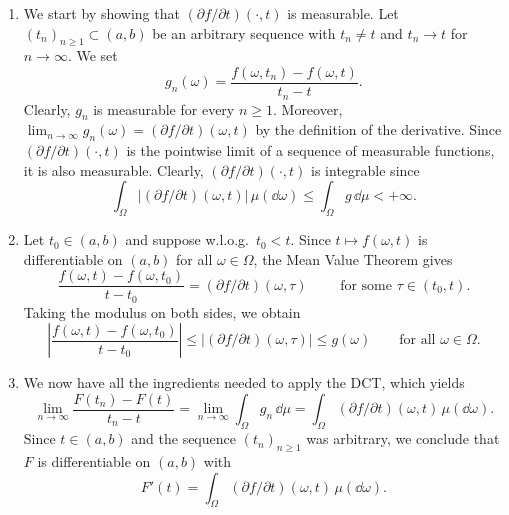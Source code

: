 \begin{enumerate}[label={(\arabic*)}]
	\item We start by showing that $(\partial f/\partial t)(\cdot,t)$ is measurable. Let $(t_n)_{n\ge 1}\subset(a,b)$ be an arbitrary sequence with $t_n\ne t$ and $t_n\to t$ for $n\to\infty$. We set
	\[
		g_n(\omega) = \frac{f(\omega,t_n)-f(\omega,t)}{t_n-t}.
	\]
	Clearly, $g_n$ is measurable for every $n\ge 1$. Moreover, $\lim_{n\to\infty} g_n(\omega) = (\partial f/\partial t)(\omega,t)$ by the definition of the derivative. Since $(\partial f/\partial t)(\cdot,t)$ is the pointwise limit of a sequence of measurable functions, it is also measurable. Clearly, $(\partial f/\partial t)(\cdot,t)$ is integrable since
	\[
		\int_\Omega |(\partial f/\partial t)(\omega,t)|\,\mu(\dd\omega) \le \int_\Omega g\,\dd\mu <+\infty.
	\]
	
	\item Let $t_0\in (a,b)$ and suppose w.l.o.g.\ $t_0<t$. Since $t\mapsto f(\omega,t)$ is differentiable on $(a,b)$ for all $\omega\in\Omega$, the Mean Value Theorem gives
	\[
		\frac{f(\omega,t)-f(\omega,t_0)}{t-t_0} = (\partial f/\partial t)(\omega,\tau)\qquad\text{	for some $\tau\in(t_0,t)$.}
	\]
	Taking the modulus on both sides, we obtain
	\[
		\left|\frac{f(\omega,t)-f(\omega,t_0)}{t-t_0}\right| \le |(\partial f/\partial t)(\omega,\tau)|\le g(\omega)\qquad\text{for all $\omega\in\Omega$}.
	\]
	\item We now have all the ingredients needed to apply the DCT, which yields
	\[
		\lim_{n\to\infty} \frac{F(t_n)-F(t)}{t_n-t} = \lim_{n\to\infty} \int_\Omega g_n\,\dd\mu = \int_\Omega (\partial f/\partial t)(\omega,t)\,\mu(\dd\omega).
	\]
	Since $t\in(a,b)$ and the sequence $(t_n)_{n\ge 1}$ was arbitrary, we conclude that $F$ is differentiable on $(a,b)$ with 
	\[
		F'(t) = \int_\Omega (\partial f/\partial t)(\omega,t)\,\mu(\dd\omega).
	\]
\end{enumerate}

